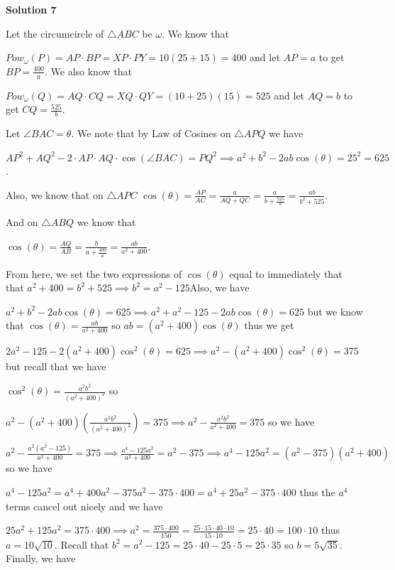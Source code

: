 \begin{enumerate}
\textbf{Solution 7}

Let the circumcircle of $\triangle ABC$ be $\omega$. We know that

 $Pow_{\omega}(P) = AP \cdot BP = XP \cdot PY = 10(25 + 15) = 400$ and let $AP = a$ to get $BP = \frac{400}{a}$. We also know that

 $Pow_{\omega}(Q) = AQ \cdot CQ = XQ \cdot QY = (10 + 25)(15) = 525$ and let $AQ = b$ to get $CQ = \frac{525}{b}$.

 Let $\angle BAC = \theta$. We note that by Law of Cosines on $\triangle APQ$ we have

 $AP^2 + AQ^2 - 2\cdot AP \cdot AQ \cdot \cos(\angle BAC) = PQ^2 \implies a^2 + b^2 - 2ab\cos(\theta) = 25^2 = 625$.

 Also, we know that on $\triangle APC$
$\cos(\theta) = \frac{AP}{AC} = \frac{a}{AQ + QC} = \frac{a}{b + \frac{525}{b}} = \frac{ab}{b^2 + 525}$.

 And on $\triangle ABQ$ we know that

 $\cos(\theta) = \frac{AQ}{AB} = \frac{b}{a + \frac{400}{a}} = \frac{ab}{a^2 + 400}$.

 From here, we set the two expressions of $\cos(\theta)$ equal to immediately that that $a^2 + 400 = b^2 + 525 \implies b^2 = a^2 - 125$Also, we have

 $a^2 + b^2 - 2ab\cos(\theta) = 625 \implies a^2 + a^2 - 125 - 2ab\cos(\theta) = 625$ but we know that $\cos(\theta) = \frac{ab}{a^2 + 400}$ so $ab = (a^2 + 400)\cos(\theta)$ thus we get

 $2a^2 - 125 - 2(a^2 + 400)\cos^2(\theta) = 625 \implies a^2 - (a^2 + 400)\cos^2(\theta) = 375$ but recall that we have

 $\cos^2(\theta) = \frac{a^2 b^2}{(a^2 + 400)^2}$ so

 $a^2 - (a^2 + 400)(\frac{a^2 b^2}{(a^2 + 400)^2}) = 375 \implies a^2 - \frac{a^2 b^2}{a^2 + 400} = 375$ so we have

 $a^2 - \frac{a^2(a^2 - 125)}{a^2 + 400} = 375 \implies \frac{a^4 - 125a^2}{a^2 + 400} = a^2 - 375 \implies a^4 - 125a^2 = (a^2 - 375)(a^2 + 400)$ so we have

 $a^4 - 125a^2 = a^4 + 400a^2 - 375a^2 - 375 \cdot 400 = a^4 + 25a^2 - 375 \cdot 400$ thus the $a^4$ terms cancel out nicely and we have

 $25a^2 + 125a^2 = 375 \cdot 400 \implies a^2 = \frac{375 \cdot 400}{150} = \frac{25 \cdot 15 \cdot 40 \cdot 10}{15 \cdot 10} = 25 \cdot 40 = 100 \cdot 10$ thus $a = 10\sqrt{10}$. Recall that $b^2 = a^2 - 125 = 25 \cdot 40 - 25 \cdot 5 = 25 \cdot 35$ so $b = 5\sqrt{35}$. Finally, we have


\end{enumerate}
